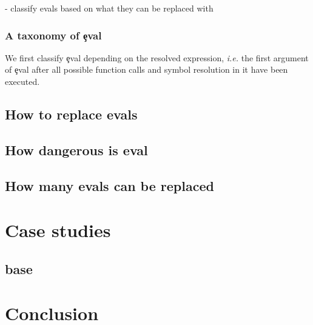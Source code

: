 \documentclass[conference]{IEEEtran}
\begin{document}
- classify evals based on what they can be replaced with

\subsubsection{A taxonomy of \c{eval}}

We first classify \c{eval} depending on the resolved expression, \emph{i.e.}
the first argument of \c{eval} after all possible function calls and symbol
resolution in it have been executed.



\subsection{How to replace evals}


\subsection{How dangerous is eval}

\subsection{How many evals can be replaced}

\section{Case studies}

\subsection{base}


\section{Conclusion}



\end{document}
